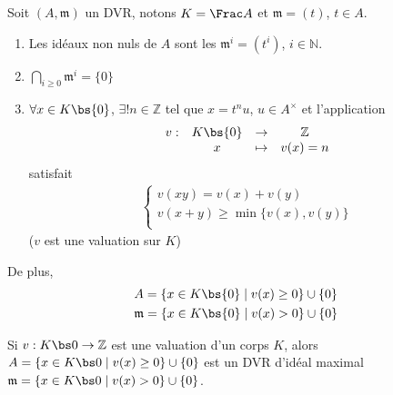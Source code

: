         \begin{prop}
            Soit $(A, \mathfrak{m})$ un DVR, notons $K = \Frac A$ et $\mathfrak{m} = (t)$, $t \in A$.
            \begin{enumerate}
                \item Les idéaux non nuls de $A$ sont les $\mathfrak{m}^i = (t^i)$, $i \in \mathbb{N}$.
                \item $\bigcap_{i \geq 0} \mathfrak{m}^i = \{0\}$
                \item $\forall x \in K \bs \{0\}$, $\exists ! n \in \mathbb{Z}$ tel que $x = t^nu$, $u \in A^\times$ et l'application
                \begin{align*}
                    \begin{array}{cccc}
                        v : & K \bs \{0\} & \to & \mathbb{Z} \\
                        & x & \mapsto & v(x) = n \\
                    \end{array}
                \end{align*}
                satisfait 
                \begin{align*}
                    \begin{cases}
                        v(xy) = v(x) + v(y) \\
                        v(x + y) \geq \min \{v(x), v(y)\} \\
                    \end{cases}
                \end{align*}
                ($v$ est une valuation sur $K$)
            \end{enumerate}
            De plus,
            \begin{align*}
                &A = \{x \in K \bs \{0\} \mid v(x) \geq 0\} \cup \{0\} \\
                &\mathfrak{m} = \{x \in K \bs \{0\} \mid v(x) > 0\} \cup \{0\} \\
            \end{align*}
        \end{prop}
        \begin{exo}
            Si $v : K \bs 0 \to \mathbb{Z}$ est une valuation d'un corps $K$, alors $A = \{x \in K \bs 0 \mid v(x) \geq 0\} \cup \{0\}$ est un DVR d'idéal maximal $\mathfrak{m} = \{x \in K \bs 0 \mid v(x) > 0\} \cup \{0\}$. 
        \end{exo}
